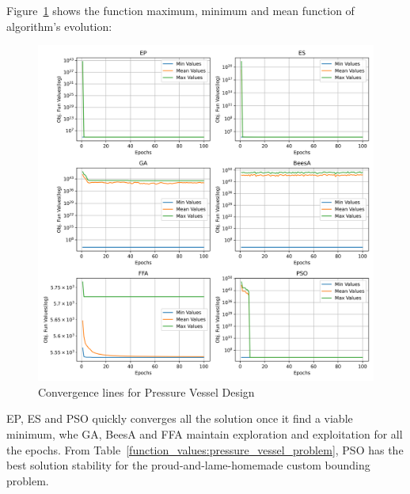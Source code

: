 
Figure~\ref{fig:pressure_vessel_problem_convergence} shows the
function maximum, minimum and mean function of algorithm's evolution:

\begin{figure}[H]
\centering
\caption{Convergence lines for Pressure Vessel Design}
\label{fig:pressure_vessel_problem_convergence}
\includegraphics[width=0.4 \textwidth]{images/pressure_vessel_problem_convergence.png}
\end{figure}

EP, ES and PSO quickly converges all the solution once it find a viable minimum, whe GA, BeesA and FFA
maintain exploration and exploitation for all the epochs.
From Table~\ref{function_values:pressure_vessel_problem},
PSO has the best solution stability for the proud-and-lame-homemade custom bounding problem.

